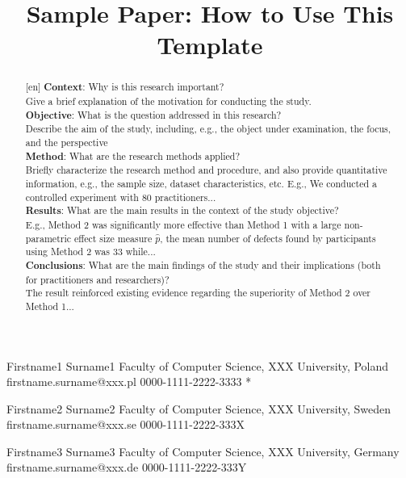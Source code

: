 \documentclass[]{einformatica}
\begin{document}

\title{Sample Paper: How to Use This Template}



\EIauthorI
   {Firstname1}
   {Surname1}
   {Faculty of Computer Science, XXX University, Poland}
   {firstname.surname@xxx.pl}
   {0000-1111-2222-3333}
   {*} %

\EIauthorII
   {Firstname2}
   {Surname2}
   {Faculty of Computer Science, XXX University, Sweden}
   {firstname.surname@xxx.se}
   {0000-1111-2222-333X}
   {} %
   
\EIauthorIII
   {Firstname3}
   {Surname3}
   {Faculty of Computer Science, XXX University, Germany}
   {firstname.surname@xxx.de}
   {0000-1111-2222-333Y}
   {} %
 

\begin{abstract}[en]
\textbf{Context}: 
Why is this research important?\\
Give a brief explanation of the motivation for conducting the study.\\
\textbf{Objective}: 
What is the question addressed in this research?\\
Describe the aim of the study, including, e.g., the object under examination, the focus, and the perspective\\
\textbf{Method}: 
What are the research methods applied?\\
Briefly characterize the research method and procedure, and also provide quantitative information, e.g., the sample size, dataset characteristics, etc.  
E.g., We conducted a controlled experiment with 80 practitioners...\\
\textbf{Results}: 
What are the main results in the context of the study objective? \\
E.g., Method 2 was significantly more effective than Method 1 with a large non-parametric effect size measure $\hat{p}$, the mean number of defects found by participants using Method 2 was 33 while...\\
\textbf{Conclusions}: 
What are the main findings of the study and their implications (both for practitioners and researchers)?\\
The result reinforced existing evidence regarding the superiority of Method 2 over Method 1...
\end{abstract}
\end{document}
